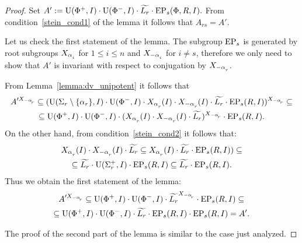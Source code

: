 \begin{proof} Set $A':=\operatorname{U}(\Phi^+, I)\cdot \operatorname{U}(\Phi^-, I) \cdot \widetilde{L_r} \cdot \operatorname{EP}_s(\Phi, R, I).$
From condition~\ref{stein_cond1} of the lemma it follows that $A_{rs}=A'$.

Let us check the first statement of the lemma. The subgroup $\operatorname{EP}_s$ is generated by root subgroups $X_{\alpha\ssub{i}}$ for $1\leq i\leq n$ and $X_{-\alpha\ssub{i}}$ for $i\neq s$,
therefore we only need to show that $A'$ is invariant with respect to conjugation by $X_{-\alpha\ssub{r}}$.

From Lemma~\ref{lemma:dv_unipotent} it follows that
\begin{multline}\nonumber A'^{X_{-\alpha\ssub{r}}} \subseteq (\U(\Sigma_r\setminus \{\alpha_r\}, I) \cdot \U(\Phi^-, I) \cdot X_{\alpha\ssub{r}}(I) \cdot X_{-\alpha\ssub{r}}(I) \cdot \widetilde{L_r} \cdot \EP_s(R, I))^{X_{-\alpha\ssub{r}}} \subseteq \\
\subseteq \U(\Phi^+, I) \cdot \U(\Phi^-, I) \cdot (X_{\alpha\ssub{r}}(I) \cdot X_{-\alpha\ssub{r}}(I) \cdot \widetilde{L_r})^{X_{-\alpha\ssub{r}}} \cdot \EP_s(R, I). \end{multline}
On the other hand, from condition~\ref{stein_cond2} it follows that:
\begin{multline}\nonumber 
X_{\alpha\ssub{r}}(I) \cdot X_{-\alpha\ssub{r}}(I) \cdot \widetilde{L_r} \subseteq
X_{\alpha\ssub{r}}(I) \cdot \widetilde{L_r} \cdot \EP_s(R, I)) \subseteq \\ \subseteq
\widetilde{L_r} \cdot \U(\Sigma_r^+, I) \cdot \EP_s(R, I) \subseteq \widetilde{L_r} \cdot \EP_s(R, I). \end{multline}
Thus we obtain the first statement of the lemma:
\begin{multline}\nonumber 
 A'^{X_{-\alpha\ssub{r}}} \subseteq \U(\Phi^+, I) \cdot \U(\Phi^-, I) \cdot \widetilde{L_r} ^{X_{-\alpha\ssub{r}}} \cdot \EP_s(R, I) \subseteq \\ \subseteq
 \U(\Phi^+, I) \cdot \U(\Phi^-, I) \cdot \widetilde{L_r} \cdot \EP_s(R, I) \cdot \EP_s(R, I) = A'. \end{multline}
 
The proof of the second part of the lemma is similar to the case just analyzed. \end{proof}

